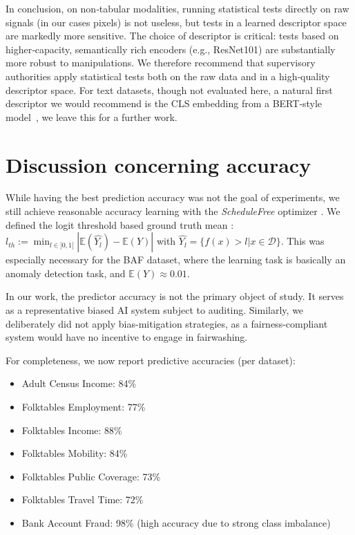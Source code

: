 \documentclass[runningheads, orivec]{llncs}
\begin{document}
In conclusion, on non‑tabular modalities, running statistical tests directly on raw signals (in our cases pixels) is not useless, but tests in a learned descriptor space are markedly more sensitive. The choice of descriptor is critical: tests based on higher‑capacity, semantically rich encoders (e.g., ResNet101) are substantially more robust to manipulations. We therefore recommend that supervisory authorities apply statistical tests both on the raw data and in a high‑quality descriptor space. For text datasets, though not evaluated here, a natural first descriptor we would recommend is the CLS embedding from a BERT‑style model~\cite{devlin2019bertpretrainingdeepbidirectional}, we leave this for a further work.

\section{Discussion concerning accuracy}
\label{app:sec:accuracy}

While having the best prediction accuracy was not the goal of experiments, we still achieve reasonable accuracy learning with the {\it ScheduleFree} optimizer \cite{defazio2024road}. We defined the logit threshold based ground truth mean : $ l_{th} := \min_{ l \in ]0,1[} | \mathbb{E}(\widehat{Y_l}) - \mathbb{E}(Y)|$ with $\widehat{Y_l} = \{ f(x) > l | x\in \mathcal{D}\}$. This was especially necessary for the BAF dataset, where the learning task is basically an anomaly detection task, and $\mathbb{E}(Y) \approx 0.01$. 

In our work, the predictor accuracy is not the primary object of study. It serves as a representative biased AI system subject to auditing. Similarly, we deliberately did not apply bias-mitigation strategies, as a fairness-compliant system would have no incentive to engage in fairwashing.

For completeness, we now report predictive accuracies (per dataset):
\begin{itemize}
    \item Adult Census Income: 84\%
    \item Folktables Employment: 77\%
    \item Folktables Income: 88\%
    \item Folktables Mobility: 84\%
    \item Folktables Public Coverage: 73\%
    \item Folktables Travel Time: 72\%
    \item Bank Account Fraud: 98\% (high accuracy due to strong class imbalance)
\end{itemize}
\end{document}
